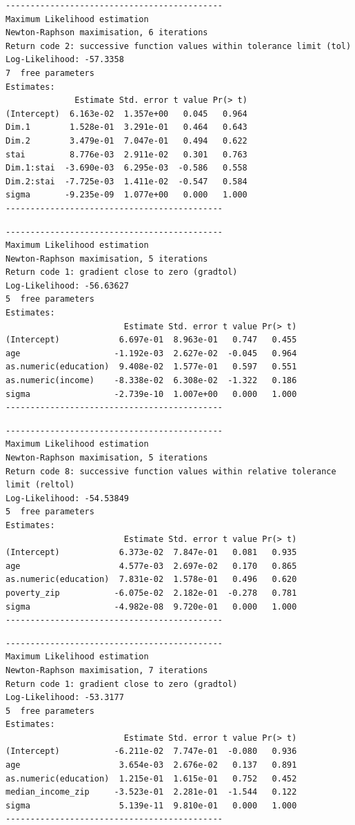 \begin{verbatim}
--------------------------------------------
Maximum Likelihood estimation
Newton-Raphson maximisation, 6 iterations
Return code 2: successive function values within tolerance limit (tol)
Log-Likelihood: -57.3358 
7  free parameters
Estimates:
              Estimate Std. error t value Pr(> t)
(Intercept)  6.163e-02  1.357e+00   0.045   0.964
Dim.1        1.528e-01  3.291e-01   0.464   0.643
Dim.2        3.479e-01  7.047e-01   0.494   0.622
stai         8.776e-03  2.911e-02   0.301   0.763
Dim.1:stai  -3.690e-03  6.295e-03  -0.586   0.558
Dim.2:stai  -7.725e-03  1.411e-02  -0.547   0.584
sigma       -9.235e-09  1.077e+00   0.000   1.000
--------------------------------------------
\end{verbatim}

\begin{verbatim}
--------------------------------------------
Maximum Likelihood estimation
Newton-Raphson maximisation, 5 iterations
Return code 1: gradient close to zero (gradtol)
Log-Likelihood: -56.63627 
5  free parameters
Estimates:
                        Estimate Std. error t value Pr(> t)
(Intercept)            6.697e-01  8.963e-01   0.747   0.455
age                   -1.192e-03  2.627e-02  -0.045   0.964
as.numeric(education)  9.408e-02  1.577e-01   0.597   0.551
as.numeric(income)    -8.338e-02  6.308e-02  -1.322   0.186
sigma                 -2.739e-10  1.007e+00   0.000   1.000
--------------------------------------------
\end{verbatim}

\begin{verbatim}
--------------------------------------------
Maximum Likelihood estimation
Newton-Raphson maximisation, 5 iterations
Return code 8: successive function values within relative tolerance limit (reltol)
Log-Likelihood: -54.53849 
5  free parameters
Estimates:
                        Estimate Std. error t value Pr(> t)
(Intercept)            6.373e-02  7.847e-01   0.081   0.935
age                    4.577e-03  2.697e-02   0.170   0.865
as.numeric(education)  7.831e-02  1.578e-01   0.496   0.620
poverty_zip           -6.075e-02  2.182e-01  -0.278   0.781
sigma                 -4.982e-08  9.720e-01   0.000   1.000
--------------------------------------------
\end{verbatim}

\begin{verbatim}
--------------------------------------------
Maximum Likelihood estimation
Newton-Raphson maximisation, 7 iterations
Return code 1: gradient close to zero (gradtol)
Log-Likelihood: -53.3177 
5  free parameters
Estimates:
                        Estimate Std. error t value Pr(> t)
(Intercept)           -6.211e-02  7.747e-01  -0.080   0.936
age                    3.654e-03  2.676e-02   0.137   0.891
as.numeric(education)  1.215e-01  1.615e-01   0.752   0.452
median_income_zip     -3.523e-01  2.281e-01  -1.544   0.122
sigma                  5.139e-11  9.810e-01   0.000   1.000
--------------------------------------------
\end{verbatim}

